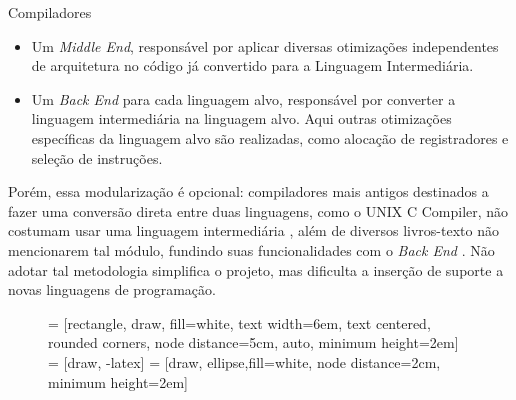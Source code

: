 \begin{section}{Compiladores}
\begin{itemize}
    \item Um \textit{Middle End}, responsável por aplicar diversas otimizações
independentes de arquitetura no código já convertido para a Linguagem Intermediária.

    \item Um \textit{Back End} para cada linguagem alvo, responsável por converter a linguagem intermediária
na linguagem alvo. Aqui outras otimizações específicas da linguagem alvo são realizadas,
como alocação de registradores e seleção de instruções.

\end{itemize}

Porém, essa modularização é opcional: compiladores mais antigos destinados a fazer uma
conversão direta entre duas linguagens, como o UNIX C Compiler, não costumam usar uma linguagem
intermediária \citep{ritchie1979tour}, além de diversos livros-texto não mencionarem tal módulo, fundindo suas
funcionalidades com o \textit{Back End} \citep{dragonbook}. Não adotar tal metodologia
simplifica o projeto, mas dificulta a inserção de suporte a novas
linguagens de programação.


\begin{figure}
 = [rectangle, draw, fill=white,
    text width=6em, text centered, rounded corners, node distance=5cm, auto, minimum height=2em]
 = [draw, -latex]
 = [draw, ellipse,fill=white, node distance=2cm,
    minimum height=2em]

\begin{center}
\end{center}
\end{figure}
\end{section}
